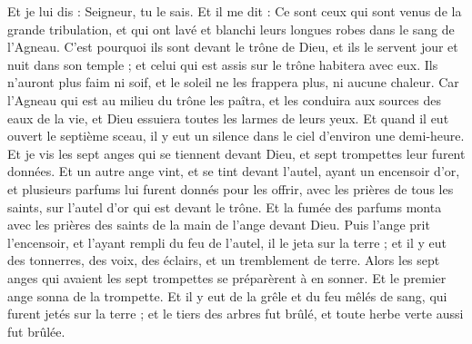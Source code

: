 \begin{multicols}{2}
Et je lui dis : Seigneur, tu le sais. Et il me dit : Ce sont ceux qui sont venus de la grande tribulation, et qui ont lavé et blanchi leurs longues robes dans le sang de l'Agneau.
C'est pourquoi ils sont devant le trône de Dieu, et ils le servent jour et nuit dans son temple ; et celui qui est assis sur le trône habitera avec eux.
Ils n'auront plus faim ni soif, et le soleil ne les frappera plus, ni aucune chaleur.
Car l'Agneau qui est au milieu du trône les paîtra, et les conduira aux sources des eaux de la vie, et Dieu essuiera toutes les larmes de leurs yeux.
\VerseOne{}Et quand il eut ouvert le septième sceau, il y eut un silence dans le ciel d'environ une demi-heure.
Et je vis les sept anges qui se tiennent devant Dieu, et sept trompettes leur furent données.
Et un autre ange vint, et se tint devant l'autel, ayant un encensoir d'or, et plusieurs parfums lui furent donnés pour les offrir, avec les prières de tous les saints, sur l'autel d'or qui est devant le trône.
Et la fumée des parfums monta avec les prières des saints de la main de l'ange devant Dieu.
Puis l'ange prit l'encensoir, et l'ayant rempli du feu de l'autel, il le jeta sur la terre ; et il y eut des tonnerres, des voix, des éclairs, et un tremblement de terre.
Alors les sept anges qui avaient les sept trompettes se préparèrent à en sonner.
Et le premier ange sonna de la trompette. Et il y eut de la grêle et du feu mêlés de sang, qui furent jetés sur la terre ; et le tiers des arbres fut brûlé, et toute herbe verte aussi fut brûlée.

\end{multicols}

